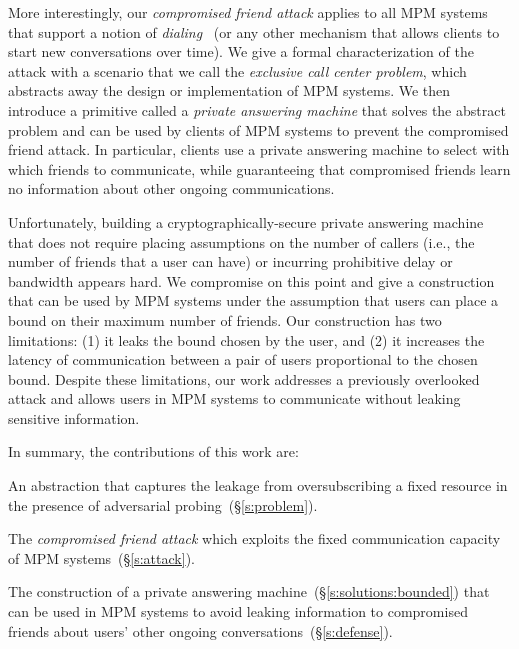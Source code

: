 More interestingly, our \emph{compromised friend attack} applies to all 
  MPM systems that support a notion of 
  \emph{dialing}~\cite{lazar16alpenhorn} (or any 
  other mechanism that allows clients to start new conversations over time).
We give a formal characterization of the attack with a scenario that
  we call the \emph{exclusive call center problem}, which abstracts away
  the design or implementation of MPM systems.
We then introduce a primitive called a \emph{private answering
  machine} that solves the abstract problem and can be used
  by clients of MPM systems to prevent the compromised friend attack.
In particular, clients use a private answering machine 
  to select with which friends to communicate, while guaranteeing that 
  compromised friends learn no information about other ongoing communications.

Unfortunately, building a cryptographically-secure private 
  answering machine that does not require placing assumptions on the
  number of callers (i.e., the number of friends that a user can have) or 
  incurring prohibitive delay or bandwidth appears hard.
We compromise on this point and give a construction that 
  can be used by MPM systems under the assumption that users can place a
  bound on their maximum number of friends.
Our construction has two limitations: (1) it leaks the bound chosen by the 
  user, and (2) it increases the latency of communication between a 
  pair of users proportional to the chosen bound.
Despite these limitations, our work addresses a previously overlooked attack 
  and allows users in MPM systems to communicate without 
  leaking sensitive information. 

In summary, the contributions of this work are:
\begin{myitemize}

\item An abstraction that captures the leakage 
  from oversubscribing a fixed resource in the presence of
  adversarial probing~(\S\ref{s:problem}). 

\item The \emph{compromised friend attack} which exploits the fixed 
  communication capacity of MPM systems~(\S\ref{s:attack}).

\item The construction of a private answering machine~(\S\ref{s:solutions:bounded}) 
  that can be used in MPM systems to avoid leaking information
  to compromised friends about users' other ongoing conversations~(\S\ref{s:defense}).

\end{myitemize}
